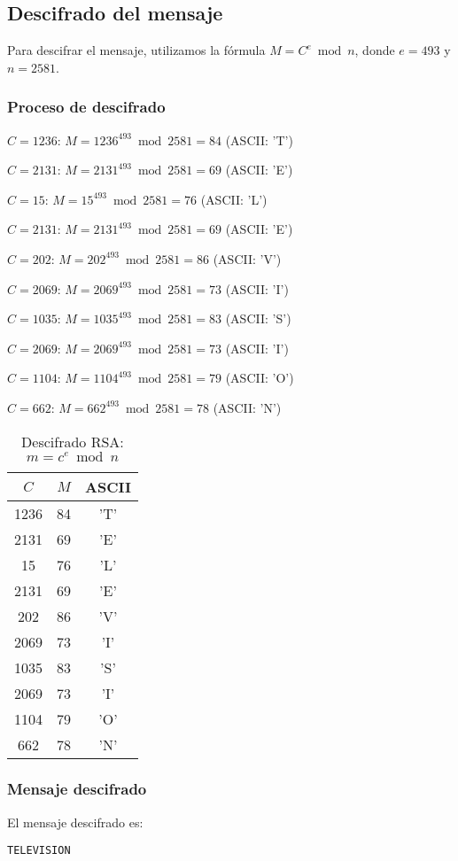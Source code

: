 \subsection{Descifrado del mensaje}

Para descifrar el mensaje, utilizamos la fórmula $M = C^e \bmod n$, donde $e = 493$ y $n = 2581$.

\subsubsection{Proceso de descifrado}

$C = 1236$: $M = 1236^{493} \bmod 2581 = 84$ (ASCII: 'T')

$C = 2131$: $M = 2131^{493} \bmod 2581 = 69$ (ASCII: 'E')

$C = 15$: $M = 15^{493} \bmod 2581 = 76$ (ASCII: 'L')

$C = 2131$: $M = 2131^{493} \bmod 2581 = 69$ (ASCII: 'E')

$C = 202$: $M = 202^{493} \bmod 2581 = 86$ (ASCII: 'V')

$C = 2069$: $M = 2069^{493} \bmod 2581 = 73$ (ASCII: 'I')

$C = 1035$: $M = 1035^{493} \bmod 2581 = 83$ (ASCII: 'S')

$C = 2069$: $M = 2069^{493} \bmod 2581 = 73$ (ASCII: 'I')

$C = 1104$: $M = 1104^{493} \bmod 2581 = 79$ (ASCII: 'O')

$C = 662$: $M = 662^{493} \bmod 2581 = 78$ (ASCII: 'N')

\begin{table}[h]
\centering
\begin{tabular}{|c|c|c|}
\hline
$C$ & $M$ & ASCII \\ \hline
1236 & 84 & 'T' \\ \hline
2131 & 69 & 'E' \\ \hline
15 & 76 & 'L' \\ \hline
2131 & 69 & 'E' \\ \hline
202 & 86 & 'V' \\ \hline
2069 & 73 & 'I' \\ \hline
1035 & 83 & 'S' \\ \hline
2069 & 73 & 'I' \\ \hline
1104 & 79 & 'O' \\ \hline
662 & 78 & 'N' \\ \hline
\end{tabular}
\caption{Descifrado RSA: $m = c^e \bmod n$}
\label{tab:descifrado}
\end{table}
\subsubsection{Mensaje descifrado}

El mensaje descifrado es:

\begin{verbatim}
TELEVISION
\end{verbatim}